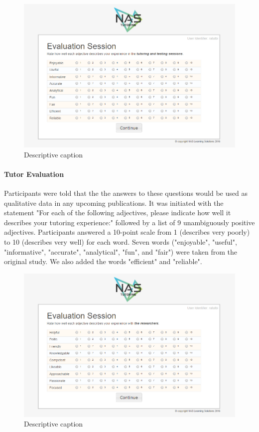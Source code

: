 \documentclass{sig-alternate-05-2015}
\begin{document}
{\begin{figure}[!h]
    \includegraphics[width=\linewidth]{figures/website/12_eval.png}
    \caption{Descriptive caption}
\end{figure}

\paragraph{Tutor Evaluation}
Participants were told that the the answers to these questions would be used as qualitative data in any upcoming publications.  It was initiated with the statement "For each of the following adjectives, please indicate how well it describes your tutoring experience:" followed by a list of 9 unambiguously positive adjectives.  Participants answered a 10-point scale from 1 (describes very poorly) to 10 (describes very well) for each word.  Seven words ("enjoyable", "useful", "informative", "accurate", "analytical", "fun", and "fair") were taken from the original study.  We also added the words "efficient" and "reliable".

\begin{figure}[!h]
    \includegraphics[width=\linewidth]{figures/website/13_eval2.png}
    \caption{Descriptive caption}
\end{figure}

}
\end{document}
